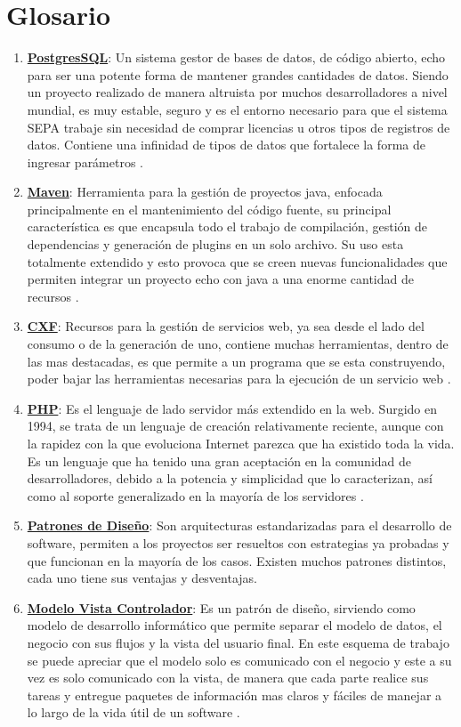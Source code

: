 \documentclass[a4paper,12pt,openany,oneside]{book}
\begin{document}
\chapter{Glosario}
\begin{enumerate}
        \item \textbf{\underline{PostgresSQL}}: Un sistema gestor de bases de datos, de código abierto, echo para ser una potente forma de mantener grandes cantidades de datos. Siendo un proyecto realizado de manera altruista por muchos desarrolladores a nivel mundial, es muy estable, seguro y es el entorno necesario para que el sistema SEPA trabaje sin necesidad de comprar licencias u otros tipos de registros de datos. Contiene una infinidad de tipos de datos que fortalece la forma de ingresar parámetros \cite{data18}.
        \item \textbf{\underline{Maven}}: Herramienta para la gestión de proyectos java, enfocada principalmente en el mantenimiento del código fuente, su principal característica es que encapsula todo el trabajo de compilación, gestión de dependencias y generación de plugins en un solo archivo. Su uso esta totalmente extendido y esto provoca que se creen nuevas funcionalidades que permiten integrar un proyecto echo con java a una enorme cantidad de recursos \cite{data26}.
        \item \textbf{\underline{CXF}}: Recursos para la gestión de servicios web, ya sea desde el lado del consumo o de la generación de uno, contiene muchas herramientas, dentro de las mas destacadas, es que permite a un programa que se esta construyendo, poder bajar las herramientas necesarias para la ejecución de un servicio web \cite{data27}.
        \item \textbf{\underline{PHP}}: Es el lenguaje de lado servidor más extendido en la web. Surgido en 1994, se trata de un lenguaje de creación relativamente reciente, aunque con la rapidez con la que evoluciona Internet parezca que ha existido toda la vida. Es un lenguaje que ha tenido una gran aceptación en la comunidad de desarrolladores, debido a la potencia y simplicidad que lo caracterizan, así como al soporte generalizado en la mayoría de los servidores \cite{data7}.
        \item \textbf{\underline{Patrones de Diseño}}: Son arquitecturas estandarizadas para el desarrollo de software, permiten a los proyectos ser resueltos con estrategias ya probadas y que funcionan en la mayoría de los casos. Existen muchos patrones distintos, cada uno tiene sus ventajas y desventajas.
	    \item \textbf{\underline{Modelo Vista Controlador}}: Es un patrón de diseño, sirviendo como modelo de desarrollo informático que permite separar el modelo de datos, el negocio con sus flujos y la vista del usuario final. En este esquema de trabajo se puede apreciar que el modelo solo es comunicado con el negocio y este a su vez es solo comunicado con la vista, de manera que cada parte realice sus tareas y entregue paquetes de información mas claros y fáciles de manejar a lo largo de la vida útil de un software \cite{data12}.

\end{enumerate}
\end{document}
